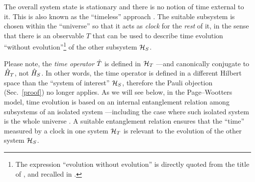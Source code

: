 The overall system state
is stationary and there is no notion
of time external to it.
This is also known as the
``timeless'' approach \parencite{Marletto:Evolution}.
\citereset
The suitable subsystem is chosen within the ``universe'' so that it acts as
\emph{clock} for the \emph{rest} of it, in the sense that
there is an observable $T$
that can be used to
describe time evolution ``without evolution''\footnote{
  The expression ``evolution without evolution''
  is directly quoted from the title of \cite{PageWootters},
  and recalled in \cite{Marletto:Evolution}.
}
of the other subsystem $\mathcal{H}_S$.

Please note,
the \emph{time operator} $\hat{T}$ is defined in $\mathcal{H}_T$ ---and canonically conjugate to $\hat{H}_T$, not $\hat{H}_S$.
In other words, the time operator is defined in a different Hilbert space than the ``system of interest'' $\mathcal{H}_S$,
therefore
the Pauli objection (Sec.~\ref{proof}) no longer applies. 
As we will see below, in the Page--Wootters model, time evolution is based on an internal entanglement
relation among subsystems of an isolated system
---including the case where such isolated system is the whole universe \parencite{PageWootters}.
A suitable entanglement relation ensures that 
the ``time'' measured by a clock in one system $\mathcal{H}_T$ is relevant to the evolution of the other
system $\mathcal{H}_S$.


